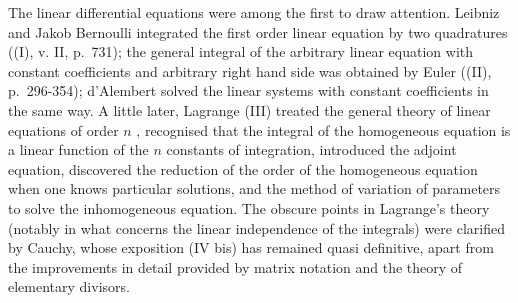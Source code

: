 The linear differential equations were among the first to draw attention. Leibniz and Jakob Bernoulli integrated the first order linear equation by two quadratures ((I), v. II, p.~731); the general integral of the arbitrary linear equation with constant coefficients and arbitrary right hand side was obtained by Euler ((II), p.~296-354); d'Alembert solved the linear systems with constant coefficients in the same way. A little later, Lagrange (III) treated the general theory of linear equations of order \(n\) , recognised that the integral of the homogeneous equation is a linear function of the \(n\) constants of integration, introduced the adjoint equation, discovered the reduction of the order of the homogeneous equation when one knows particular solutions, and the method of variation of parameters to solve the inhomogeneous equation. The obscure points in Lagrange's theory (notably in what concerns the linear independence of the integrals) were clarified by Cauchy, whose exposition (IV bis) has remained quasi definitive, apart from the improvements in detail provided by matrix notation and the theory of elementary divisors.

